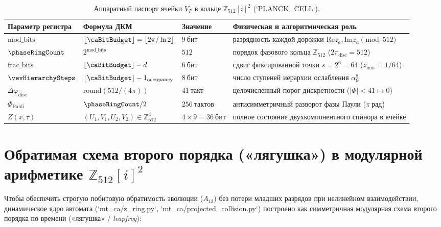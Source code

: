\begin{table}[htbp]
\centering
\caption{Аппаратный паспорт ячейки $V_P$ в кольце $\mathbb{Z}_{512}[i]^2$ (`PLANCK\_CELL`).}
\label{tab:compute-cell-passport}
\footnotesize
\setlength{\tabcolsep}{3.5pt}
\begin{tabular}{@{}llll@{}}
\toprule
Параметр регистра & Формула ДКМ & Значение & Физическая и алгоритмическая роль \\
\midrule
$\mathrm{mod\_bits}$ & $\lfloor\caBitBudget\rfloor = \lfloor 2\pi/\ln 2\rfloor$ & $9\ \mathrm{бит}$ & разрядность каждой дорожки $\mathrm{Re} z_a, \mathrm{Im} z_a \pmod{512}$ \\
$\phaseRingCount$ & $2^{\mathrm{mod\_bits}}$ & $512$ & порядок фазового кольца $\mathbb{Z}_{512}$ ($2\pi_{\mathrm{disc}} = 512$) \\
$\mathrm{frac\_bits}$ & $\lfloor\caBitBudget\rfloor - d$ & $6\ \mathrm{бит}$ & сдвиг фиксированной точки $s = 2^6 = 64$ ($z_{\min} = 1/64$) \\
$\vevHierarchySteps$ & $\lfloor\caBitBudget\rfloor - 1_{\mathrm{occupancy}}$ & $8\ \mathrm{бит}$ & число ступеней иерархии ослабления $\alpha_{\mathrm{fs}}^8$ \\
$\Delta\varphi_{\mathrm{disc}}$ & $\mathrm{round}(512 / (4\pi))$ & $41\ \mathrm{такт}$ & целочисленный порог дискретности ($|\Phi| < 41 \mapsto 0$) \\
$\Phi_{\mathrm{Pauli}}$ & $\phaseRingCount / 2$ & $256\ \mathrm{тактов}$ & антисимметричный разворот фазы Паули ($\pi\ \mathrm{рад}$) \\
$Z(x,\tau)$ & $(U_1, V_1, U_2, V_2) \in \mathbb{Z}_{512}^4$ & $4\times 9 = 36\ \mathrm{бит}$ & полное состояние двухкомпонентного спинора в ячейке \\
\bottomrule
\end{tabular}
\end{table}

\chapter{Обратимая схема второго порядка («лягушка») в модулярной арифметике \texorpdfstring{$\mathbb{Z}_{512}[i]^2$}{Z\_512[i]\^2}}
\label{ch:compute-reversible-leapfrog}

Чтобы обеспечить строгую побитовую обратимость эволюции ($A_{13}$) без потери младших разрядов при нелинейном взаимодействии, динамическое ядро автомата (`mt\_ca/z\_ring.py`, `mt\_ca/projected\_collision.py`) построено как симметричная модулярная схема второго порядка по времени («лягушка» / \emph{leapfrog}):

